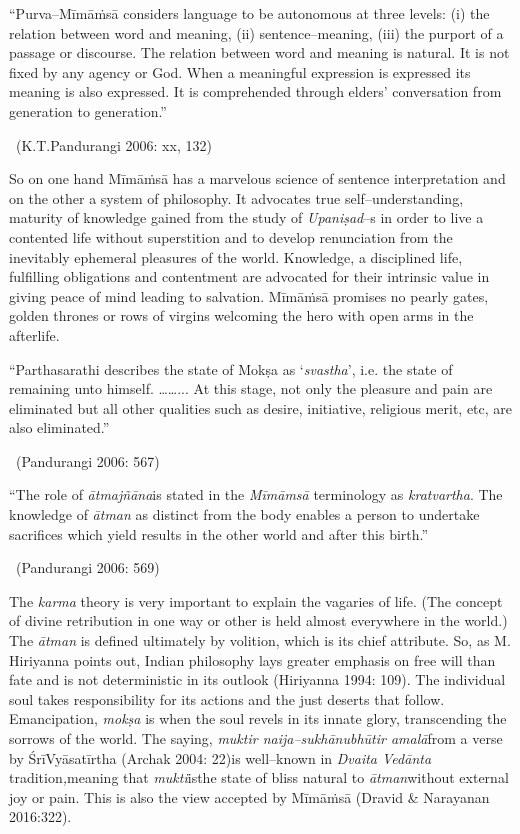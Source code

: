 \begin{myquote}
“Purva–Mīmāṁsā considers language to be autonomous at three levels: (i) the relation between word and meaning, (ii) sentence–meaning, (iii) the purport of a passage or discourse. The relation between word and meaning is natural. It is not fixed by any agency or God. When a meaningful expression is expressed its meaning is also expressed. It is comprehended through elders’ conversation from generation to generation.” 

~\hfill (K.T.Pandurangi 2006: xx, 132)
\end{myquote}

So on one hand Mīmāṁsā has a marvelous science of sentence interpretation and on the other a system of philosophy. It advocates true self–understanding, maturity of knowledge gained from the study of \textit{Upaniṣad}–s in order to live a contented life without superstition and to develop renunciation from the inevitably ephemeral pleasures of the world. Knowledge, a disciplined life, fulfilling obligations and contentment are advocated for their intrinsic value in giving peace of mind leading to salvation. Mīmāṁsā promises no pearly gates, golden thrones or rows of virgins welcoming the hero with open arms in the afterlife.

\begin{myquote}
“Parthasarathi describes the state of Mokṣa as ‘\textit{svastha}’, i.e. the state of remaining unto himself. ……... At this stage, not only the pleasure and pain are eliminated but all other qualities such as desire, initiative, religious merit, etc, are also eliminated.” 

~\hfill (Pandurangi 2006: 567)
\end{myquote}

\begin{myquote}
“The role of \textit{ātmajñāna}is stated in the\textit{ Mīmāmsā} terminology as \textit{kratvartha}. The knowledge of \textit{ātman} as distinct from the body enables a person to undertake sacrifices which yield results in the other world and after this birth.” 

~\hfill (Pandurangi 2006: 569)
\end{myquote}

The \textit{karma} theory is very important to explain the vagaries of life. (The concept of divine retribution in one way or other is held almost everywhere in the world.) The \textit{ātman} is defined ultimately by volition, which is its chief attribute. So, as M. Hiriyanna points out, Indian philosophy lays greater emphasis on free will than fate and is not deterministic in its outlook (Hiriyanna 1994: 109). The individual soul takes responsibility for its actions and the just deserts that follow. Emancipation, \textit{mokṣa} is when the soul revels in its innate glory, transcending the sorrows of the world. The saying, \textit{muktir naija–sukhānubhūtir amalā}from a verse by ŚrīVyāsatīrtha (Archak 2004: 22)is well–known in \textit{Dvaita Vedānta} tradition\textit{,}meaning that\textit{ mukti}isthe state of bliss natural to\textit{ ātman}without external joy or pain. This is also the view accepted by Mīmāṁsā (Dravid \& Narayanan 2016:322).


